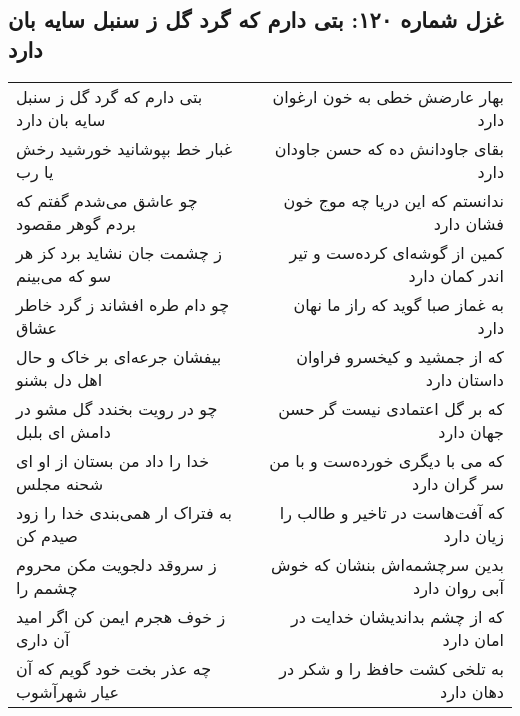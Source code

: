 \begin{center}
\section*{غزل شماره ۱۲۰: بتی دارم که گرد گل ز سنبل سایه بان دارد}
\label{sec:sh120}
\begin{longtable}{l p{0.5cm} r}
بتی دارم که گرد گل ز سنبل سایه بان دارد
&&
بهار عارضش خطی به خون ارغوان دارد
\\
غبار خط بپوشانید خورشید رخش یا رب
&&
بقای جاودانش ده که حسن جاودان دارد
\\
چو عاشق می‌شدم گفتم که بردم گوهر مقصود
&&
ندانستم که این دریا چه موج خون فشان دارد
\\
ز چشمت جان نشاید برد کز هر سو که می‌بینم
&&
کمین از گوشه‌ای کرده‌ست و تیر اندر کمان دارد
\\
چو دام طره افشاند ز گرد خاطر عشاق
&&
به غماز صبا گوید که راز ما نهان دارد
\\
بیفشان جرعه‌ای بر خاک و حال اهل دل بشنو
&&
که از جمشید و کیخسرو فراوان داستان دارد
\\
چو در رویت بخندد گل مشو در دامش ای بلبل
&&
که بر گل اعتمادی نیست گر حسن جهان دارد
\\
خدا را داد من بستان از او ای شحنه مجلس
&&
که می با دیگری خورده‌ست و با من سر گران دارد
\\
به فتراک ار همی‌بندی خدا را زود صیدم کن
&&
که آفت‌هاست در تاخیر و طالب را زیان دارد
\\
ز سروقد دلجویت مکن محروم چشمم را
&&
بدین سرچشمه‌اش بنشان که خوش آبی روان دارد
\\
ز خوف هجرم ایمن کن اگر امید آن داری
&&
که از چشم بداندیشان خدایت در امان دارد
\\
چه عذر بخت خود گویم که آن عیار شهرآشوب
&&
به تلخی کشت حافظ را و شکر در دهان دارد
\\
\end{longtable}
\end{center}
